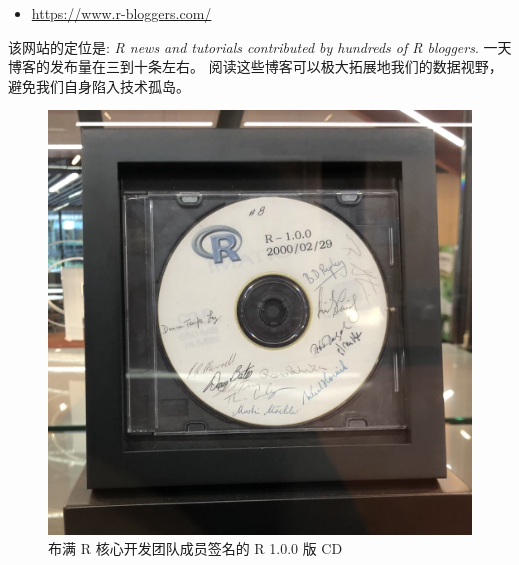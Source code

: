 \documentclass[11pt,hyperref]{ctexart}
\providecommand{\tightlist}{%
  \setlength{\itemsep}{0pt}\setlength{\parskip}{0pt}}
\begin{document}
\begin{itemize}
\tightlist
\item
  \url{https://www.r-bloggers.com/}
\end{itemize}

该网站的定位是: \emph{R news and tutorials contributed by hundreds of R
bloggers}. 一天博客的发布量在三到十条左右。
阅读这些博客可以极大拓展地我们的数据视野，避免我们自身陷入技术孤岛。

\begin{figure}
\centering
\includegraphics{images/A-CD-ROM-of-the-original-version-of-R-signed-by-the-R-Core-Team.jpg}
\caption{布满 R 核心开发团队成员签名的 R 1.0.0 版 CD}
\end{figure}
\end{document}
